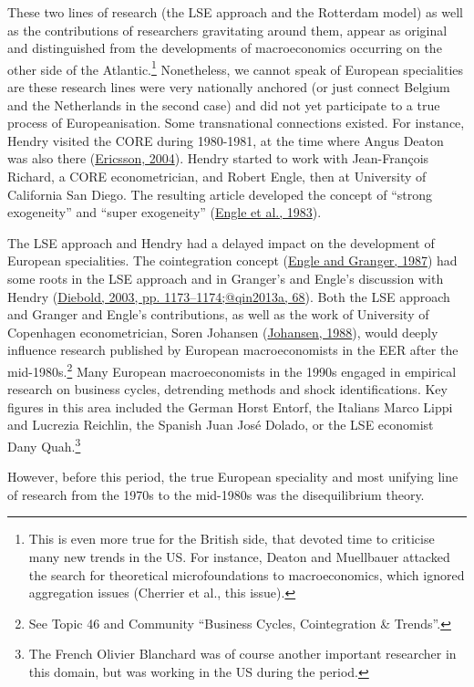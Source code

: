 \documentclass[
  12pt,
  onecolumn]{article}
\begin{document}
These two lines of research (the LSE approach and the Rotterdam model)
as well as the contributions of researchers gravitating around them,
appear as original and distinguished from the developments of
macroeconomics occurring on the other side of the Atlantic.\footnote{This
  is even more true for the British side, that devoted time to criticise
  many new trends in the US. For instance, Deaton and Muellbauer
  attacked the search for theoretical microfoundations to
  macroeconomics, which ignored aggregation issues (Cherrier et al.,
  this issue).} Nonetheless, we cannot speak of European specialities
are these research lines were very nationally anchored (or just connect
Belgium and the Netherlands in the second case) and did not yet
participate to a true process of Europeanisation. Some transnational
connections existed. For instance, Hendry visited the CORE during
1980-1981, at the time where Angus Deaton was also there
(\protect\hyperlink{ref-ericsson2004}{Ericsson, 2004}). Hendry started
to work with Jean-François Richard, a CORE econometrician, and Robert
Engle, then at University of California San Diego. The resulting article
developed the concept of ``strong exogeneity'' and ``super exogeneity''
(\protect\hyperlink{ref-engle1983}{Engle et al., 1983}).

The LSE approach and Hendry had a delayed impact on the development of
European specialities. The cointegration concept
(\protect\hyperlink{ref-engle1987}{Engle and Granger, 1987}) had some
roots in the LSE approach and in Granger's and Engle's discussion with
Hendry (\protect\hyperlink{ref-diebold2003}{Diebold, 2003, pp.
1173--1174;@qin2013a, 68}). Both the LSE approach and Granger and
Engle's contributions, as well as the work of University of Copenhagen
econometrician, Soren Johansen
(\protect\hyperlink{ref-johansen1988}{Johansen, 1988}), would deeply
influence research published by European macroeconomists in the EER
after the mid-1980s.\footnote{See Topic 46 and Community ``Business
  Cycles, Cointegration \& Trends''.} Many European macroeconomists in
the 1990s engaged in empirical research on business cycles, detrending
methods and shock identifications. Key figures in this area included the
German Horst Entorf, the Italians Marco Lippi and Lucrezia Reichlin, the
Spanish Juan José Dolado, or the LSE economist Dany Quah.\footnote{The
  French Olivier Blanchard was of course another important researcher in
  this domain, but was working in the US during the period.}

However, before this period, the true European speciality and most
unifying line of research from the 1970s to the mid-1980s was the
disequilibrium theory.
\end{document}
